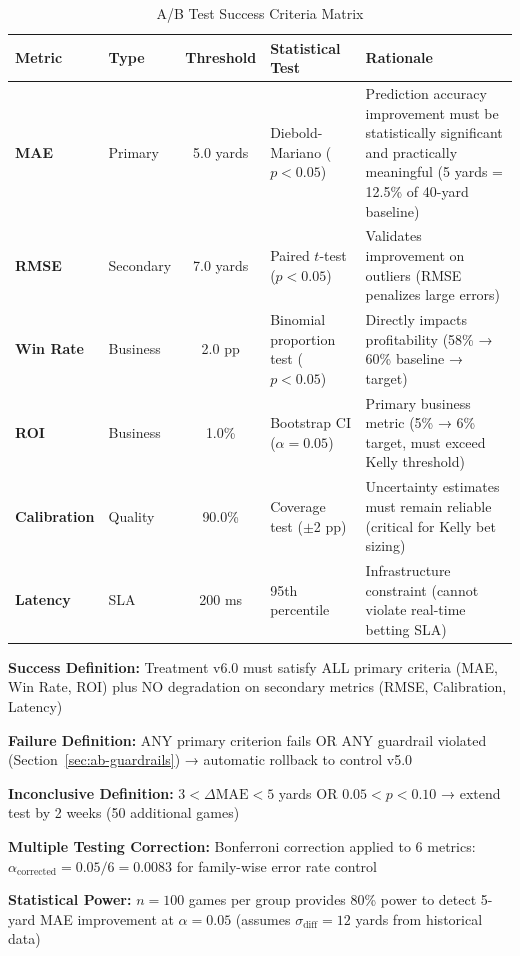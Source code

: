\begin{table}[htbp]
\centering
\small
\caption{A/B Test Success Criteria Matrix}
\label{tab:ab-success-criteria}
\begin{tabular}{@{}p{2.8cm}p{2.0cm}S[table-format=2.2]p{2.5cm}p{3.2cm}@{}}
\toprule
\textbf{Metric} & \textbf{Type} & {\textbf{Threshold}} & \textbf{Statistical Test} & \textbf{Rationale} \\
\midrule
\textbf{MAE} & Primary & {5.0} yards & Diebold-Mariano ($p < 0.05$) & Prediction accuracy improvement must be statistically significant and practically meaningful (5 yards = 12.5\% of 40-yard baseline) \\
\addlinespace[2pt]
\textbf{RMSE} & Secondary & {7.0} yards & Paired $t$-test ($p < 0.05$) & Validates improvement on outliers (RMSE penalizes large errors) \\
\addlinespace[2pt]
\textbf{Win Rate} & Business & {2.0} pp & Binomial proportion test ($p < 0.05$) & Directly impacts profitability (58\% → 60\% baseline → target) \\
\addlinespace[2pt]
\textbf{ROI} & Business & {1.0}\% & Bootstrap CI ($\alpha = 0.05$) & Primary business metric (5\% → 6\% target, must exceed Kelly threshold) \\
\addlinespace[2pt]
\textbf{Calibration} & Quality & {90.0}\% & Coverage test ($\pm$2 pp) & Uncertainty estimates must remain reliable (critical for Kelly bet sizing) \\
\addlinespace[2pt]
\textbf{Latency} & SLA & {200} ms & 95th percentile & Infrastructure constraint (cannot violate real-time betting SLA) \\
\bottomrule
\end{tabular}
\begin{tablenotes}
\item \textbf{Success Definition:} Treatment v6.0 must satisfy ALL primary criteria (MAE, Win Rate, ROI) plus NO degradation on secondary metrics (RMSE, Calibration, Latency)
\item \textbf{Failure Definition:} ANY primary criterion fails OR ANY guardrail violated (Section~\ref{sec:ab-guardrails}) → automatic rollback to control v5.0
\item \textbf{Inconclusive Definition:} $3 < \Delta\text{MAE} < 5$ yards OR $0.05 < p < 0.10$ → extend test by 2 weeks (50 additional games)
\item \textbf{Multiple Testing Correction:} Bonferroni correction applied to 6 metrics: $\alpha_{\text{corrected}} = 0.05 / 6 = 0.0083$ for family-wise error rate control
\item \textbf{Statistical Power:} $n = 100$ games per group provides 80\% power to detect 5-yard MAE improvement at $\alpha = 0.05$ (assumes $\sigma_{\text{diff}} = 12$ yards from historical data)
\end{tablenotes}
\end{table}

